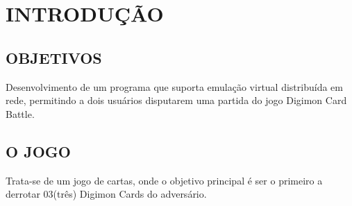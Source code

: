 \documentclass[12pt,a4paper,brazil,abntex2]{article}
\begin{document}
\thispagestyle{empty}
\tableofcontents
\newpage
\section{\normalsize INTRODUÇÃO}
	\subsection{\normalsize OBJETIVOS}
	
		Desenvolvimento de um programa que suporta emulação virtual distribuída em rede, permitindo a dois usuários disputarem uma partida do jogo Digimon Card Battle.
	
	\subsection{\normalsize O JOGO}
		Trata-se de um jogo de cartas, onde o objetivo principal é ser o primeiro a derrotar 03(três) Digimon Cards do adversário.
		
\end{document}
